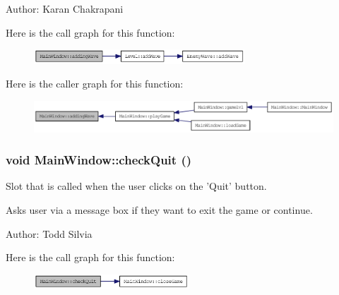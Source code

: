Author: Karan Chakrapani 

Here is the call graph for this function:\nopagebreak
\begin{figure}[H]
\begin{center}
\leavevmode
\includegraphics[width=224pt]{class_main_window_aa5e6f6d450a8cca11ebe714ac36146b0_cgraph}
\end{center}
\end{figure}


Here is the caller graph for this function:\nopagebreak
\begin{figure}[H]
\begin{center}
\leavevmode
\includegraphics[width=330pt]{class_main_window_aa5e6f6d450a8cca11ebe714ac36146b0_icgraph}
\end{center}
\end{figure}
\hypertarget{class_main_window_af5fe3a1a1b28d5a77f91ffb2ca755dc9}{
\subsubsection[{checkQuit}]{\setlength{\rightskip}{0pt plus 5cm}void MainWindow::checkQuit ()}}
\label{class_main_window_af5fe3a1a1b28d5a77f91ffb2ca755dc9}
Slot that is called when the user clicks on the 'Quit' button.

Asks user via a message box if they want to exit the game or continue.

Author: Todd Silvia 

Here is the call graph for this function:\nopagebreak
\begin{figure}[H]
\begin{center}
\leavevmode
\includegraphics[width=165pt]{class_main_window_af5fe3a1a1b28d5a77f91ffb2ca755dc9_cgraph}
\end{center}
\end{figure}


